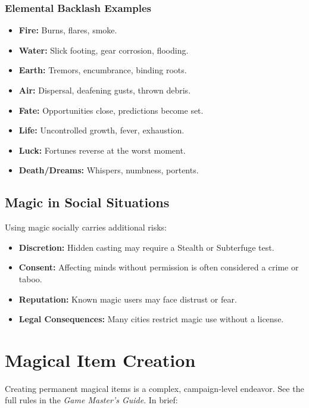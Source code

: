 \subsubsection*{Elemental Backlash Examples}
\label{sec:elemental-backlash}
\begin{itemize}
  \item \textbf{Fire:} Burns, flares, smoke.
  \item \textbf{Water:} Slick footing, gear corrosion, flooding.
  \item \textbf{Earth:} Tremors, encumbrance, binding roots.
  \item \textbf{Air:} Dispersal, deafening gusts, thrown debris.
  \item \textbf{Fate:} Opportunities close, predictions become set.
  \item \textbf{Life:} Uncontrolled growth, fever, exhaustion.
  \item \textbf{Luck:} Fortunes reverse at the worst moment.
  \item \textbf{Death/Dreams:} Whispers, numbness, portents.
\end{itemize}

\subsection{Magic in Social Situations}
\label{sec:magic-social}
Using magic socially carries additional risks:
\begin{itemize}
  \item \textbf{Discretion:} Hidden casting may require a Stealth or Subterfuge test.
  \item \textbf{Consent:} Affecting minds without permission is often considered a crime or taboo.
  \item \textbf{Reputation:} Known magic users may face distrust or fear.
  \item \textbf{Legal Consequences:} Many cities restrict magic use without a license.
\end{itemize}

\section{Magical Item Creation}
\label{sec:magic-item-creation}

Creating permanent magical items is a complex, campaign-level endeavor. See the full rules in the \textit{Game Master’s Guide}. In brief:


